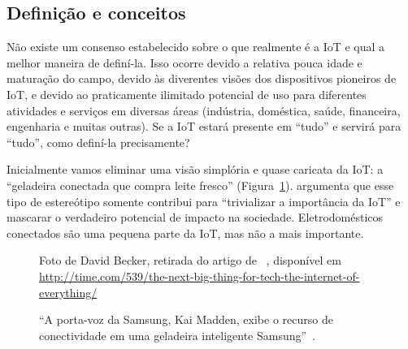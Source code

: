 \documentclass[pdftex, brazil, 12pt, twoside]{article}
\begin{document}
\subsection{Definição e conceitos}
\label{o-que-e-iot-definicao}

Não existe um consenso estabelecido sobre o que realmente é a IoT e qual a melhor
maneira de definí-la. Isso ocorre devido a relativa pouca idade e maturação do
campo, devido às diverentes visões dos dispositivos pioneiros de IoT, e devido
ao praticamente ilimitado potencial de uso para diferentes atividades e serviços
em diversas áreas (indústria, doméstica, saúde, financeira, engenharia e muitas
outras). Se a IoT estará presente em ``tudo'' e servirá para ``tudo'', como
definí-la precisamente?

Inicialmente vamos eliminar uma visão simplória e quase caricata da IoT: a
``geladeira conectada que compra leite fresco'' (Figura~\ref{fig:smart-geladeira}).
\citet{UKGOSWalportIoT2014}
argumenta que esse tipo de estereótipo somente contribui para ``trivializar
a importância da IoT'' e mascarar o verdadeiro potencial de impacto na sociedade.
Eletrodomésticos conectados são uma pequena parte da IoT, mas não a mais
importante.

\begin{figure}[H]
  \begin{center}
    \caption{``A porta-voz da Samsung, Kai Madden, exibe o recurso de conectividade em
      uma geladeira inteligente Samsung''~\citep{BajarinIoE2014}.}
    \label{fig:smart-geladeira}

    \footnotesize{Foto de David Becker, retirada do artigo de ~\citet{BajarinIoE2014},
      disponível em \url{http://time.com/539/the-next-big-thing-for-tech-the-internet-of-everything/}}
  \end{center}
\end{figure}
\end{document}
